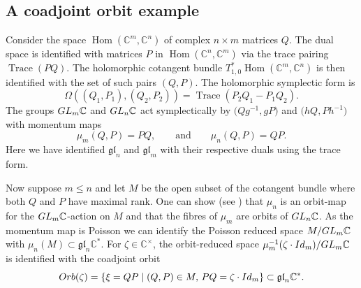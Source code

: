 \documentclass[11pt]{article}
\numberwithin{equation}{section}
\numberwithin{equation}{section}
\DeclareMathOperator{\Hom}{Hom}
\DeclareMathOperator{\Tr}{Trace}
\newcommand{\C}{\mathbb{C}}
\newcommand{\Id}{{\rm Id}}
\begin{document}
\subsection{A coadjoint orbit example}\label{theexample}
Consider the space $\Hom(\C^m,\C^n)$ of complex $n\times m$ matrices $Q$. The dual space is identified with matrices $P$ in $\Hom(\C^n,\C^m)$ via the trace pairing $\Tr(PQ)$. The holomorphic cotangent bundle $T^*_{1,0}\Hom(\C^m,\C^n)$ is then identified with the set of such pairs $(Q,P)$. The holomorphic symplectic form is
\begin{equation*}%
	\Omega((Q_1,P_1),(Q_2,P_2))=\Tr(P_2Q_1-P_1Q_2).
\end{equation*}
The groups ${\rm GL}_m\C$ and ${\rm GL}_n\C$ act symplectically by $\bigl(Qg^{-1},gP\bigr)$ and $\bigl(hQ,Ph^{-1}\bigr)$ with momentum maps
\begin{equation*}	%
	\mu_m(Q,P)=PQ,\qquad\text{and}\qquad\mu_n(Q,P)=QP.
\end{equation*}
Here we have identified $\mathfrak{gl}_n$ and $\mathfrak{gl}_m$ with their respective duals using the trace form.

Now suppose $m\le n$ and let $M$ be the open subset of the cotangent bundle where both $Q$ and $P$ have maximal rank. One can show (see \cite{dualpairs}) that $\mu_n$ is an orbit-map for the ${\rm GL}_m\C$-action on $M$ and that the fibres of $\mu_m$ are orbits of ${\rm GL}_n\C$. As the momentum map is Poisson we can identify the Poisson reduced space $M/{\rm GL}_m\C$ with $\mu_n(M)\subset\mathfrak{gl}_n\C^*$. For $\zeta\in\C^\times$, the orbit-reduced space $\mu_m^{-1}(\zeta\cdot\Id_m)/{\rm GL}_m\C$ is identified with the coadjoint orbit
\begin{equation}
	\label{coad_orbit}
	{\rm Orb}(\zeta)=\{\xi=QP\mid (Q,P)\in M,\,PQ=\zeta\cdot\Id_m\}\subset\mathfrak{gl}_n\C^*.
\end{equation}
\end{document}
